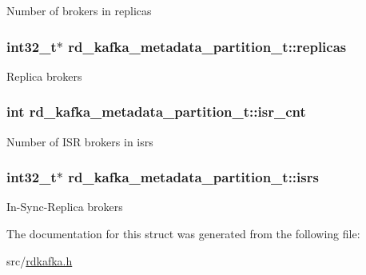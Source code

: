 \label{structrd__kafka__metadata__partition__t_a999ac89d23012cfc5ba8acc351300506}
Number of brokers in {\ttfamily replicas} \hypertarget{structrd__kafka__metadata__partition__t_ae06053cbbeb9bdcf324606cf19a00e7f}{
\subsubsection[{replicas}]{\setlength{\rightskip}{0pt plus 5cm}int32\_\-t$\ast$ {\bf rd\_\-kafka\_\-metadata\_\-partition\_\-t::replicas}}}
\label{structrd__kafka__metadata__partition__t_ae06053cbbeb9bdcf324606cf19a00e7f}
Replica brokers \hypertarget{structrd__kafka__metadata__partition__t_ac49c0e74551f6398bfa04245b49230d8}{
\subsubsection[{isr\_\-cnt}]{\setlength{\rightskip}{0pt plus 5cm}int {\bf rd\_\-kafka\_\-metadata\_\-partition\_\-t::isr\_\-cnt}}}
\label{structrd__kafka__metadata__partition__t_ac49c0e74551f6398bfa04245b49230d8}
Number of ISR brokers in {\ttfamily isrs} \hypertarget{structrd__kafka__metadata__partition__t_a82d9888272c26a78836f12827ffc1a64}{
\subsubsection[{isrs}]{\setlength{\rightskip}{0pt plus 5cm}int32\_\-t$\ast$ {\bf rd\_\-kafka\_\-metadata\_\-partition\_\-t::isrs}}}
\label{structrd__kafka__metadata__partition__t_a82d9888272c26a78836f12827ffc1a64}
In-\/Sync-\/Replica brokers 

The documentation for this struct was generated from the following file:\begin{DoxyCompactItemize}
\item 
src/\hyperlink{rdkafka_8h}{rdkafka.h}\end{DoxyCompactItemize}
